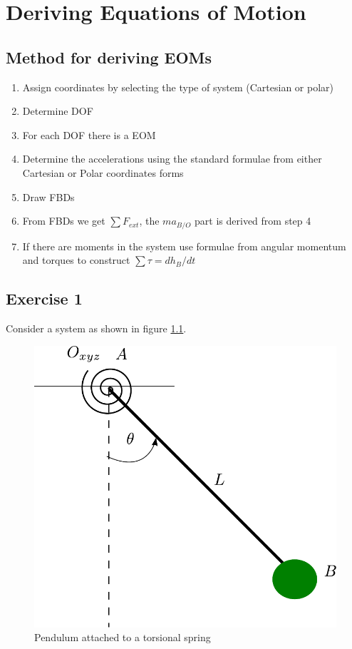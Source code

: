 \chapter{Deriving Equations of Motion}

\section{Method for deriving EOMs}

\begin{enumerate}
	\item Assign coordinates by selecting the type of system (Cartesian or polar)
	\item Determine DOF
	\item For each DOF there is a EOM
	\item Determine the accelerations using the standard formulae from either Cartesian or Polar coordinates forms
	\item Draw FBDs
	\item From FBDs we get $\sum F_{ext}$, the $m a_{B/O}$ part is derived from step 4
	\item If there are moments in the system use formulae from angular momentum and torques to construct $\sum \tau = d h_{B} / dt$
\end{enumerate}

\section{Exercise 1}

Consider a system as shown in figure \ref{fig_0_ch_4_exercise1}.
\begin{figure}[h!]
	\centering
	\includegraphics[width=0.5\linewidth]{Bilder/17_PendulumExercise.pdf}
	\caption{Pendulum attached to a torsional spring}
	\label{fig_0_ch_4_exercise1}
\end{figure}

